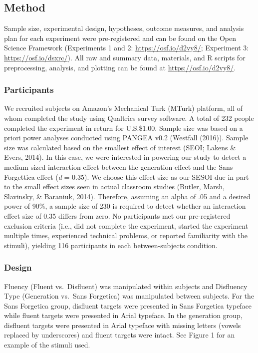 \documentclass[
  english,
  jou]{apa6}
\begin{document}
\hypertarget{method}{%
\subsection{Method}\label{method}}

Sample size, experimental design, hypotheses, outcome measures, and analysis plan for each experiment were pre-registered and can be found on the Open Science Framework (Experiments 1 and 2: \url{https://osf.io/d2vy8/}; Experiment 3: \url{https://osf.io/dsxrc/}). All raw and summary data, materials, and R scripts for preprocessing, analysis, and plotting can be found at \url{https://osf.io/d2vy8/}.

\hypertarget{participants}{%
\subsubsection{Participants}\label{participants}}

We recruited subjects on Amazon's Mechanical Turk (MTurk) platform, all of whom completed the study using Qualtrics survey software. A total of 232 people completed the experiment in return for U.S.\$1.00. Sample size was based on a priori power analyses conducted using PANGEA v0.2 (Westfall (2016)). Sample size was calculated based on the smallest effect of interest (SEOI; Lakens \& Evers, 2014). In this case, we were interested in powering our study to detect a medium sized interaction effect between the generation effect and the Sans Forgettica effect (\emph{d} = 0.35). We choose this effect size as our SESOI due in part to the small effect sizes seen in actual classroom studies (Butler, Marsh, Slavinsky, \& Baraniuk, 2014). Therefore, assuming an alpha of .05 and a desired power of 90\%, a sample size of 230 is required to detect whether an interaction effect size of 0.35 differs from zero. No participants met our pre-registered exclusion criteria (i.e., did not complete the experiment, started the experiment multiple times, experienced technical problems, or reported familiarity with the stimuli), yielding 116 participants in each between-subjects condition.

\hypertarget{design}{%
\subsubsection{Design}\label{design}}

Fluency (Fluent vs.~Disfluent) was manipulated within subjects and Disfluency Type (Generation vs.~Sans Forgetica) was manipulated between subjects. For the Sans Forgetica group, disfluent targets were presented in Sans Forgetica typeface while fluent targets were presented in Arial typeface. In the generation group, disfluent targets were presented in Arial typeface with missing letters (vowels replaced by underscores) and fluent targets were intact. See Figure 1 for an example of the stimuli used.
\end{document}
